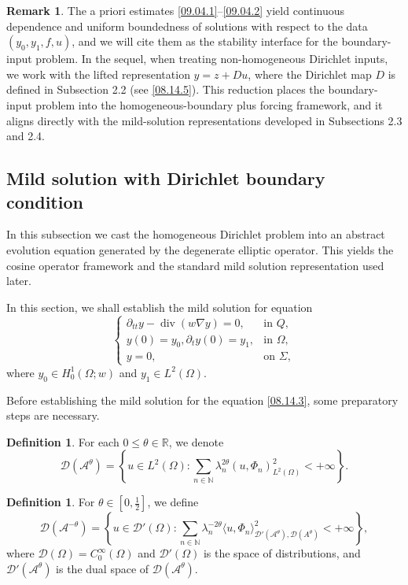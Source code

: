 \documentclass[preprint,12pt]{elsarticle}
\theoremstyle{definition}   %
\newtheorem{definition}[theorem]{Definition}
\newtheorem{remark}[theorem]{Remark}
\numberwithin{equation}{section}
\def\pt{\partial}
\def\ms{\mathscr}
\def\lg{\langle}
\def\rg{\rangle}
\def\pt{\partial}
\def\Om{\Omega}
\def\la{\lambda}
\def\iy{\infty}
\def\f{\frac}
\def\mcA{\mathcal{A}}
\def\mcD{\mathcal{D}}
\DeclareMathOperator{\Div}{div}
\newcommand{\R}{\mathbb R}
\newcommand{\N}{\mathbb N}
\begin{document}
\begin{remark}\label{rem:lifted-setting}
The a priori estimates \eqref{09.04.1}--\eqref{09.04.2} yield continuous dependence and uniform boundedness of solutions with respect to the data $(y_0,y_1,f,u)$, and we will cite them as the stability interface for the boundary-input problem. In the sequel, when treating non-homogeneous Dirichlet inputs, we work with the lifted representation $y=z+Du$, where the Dirichlet map $D$ is defined in Subsection 2.2 (see \eqref{08.14.5}). This reduction places the boundary-input problem into the homogeneous-boundary plus forcing framework, and it aligns directly with the mild-solution representations developed in Subsections 2.3 and 2.4.
\end{remark}

\subsection{Mild solution with Dirichlet boundary condition}

In this subsection we cast the homogeneous Dirichlet problem into an abstract evolution equation generated by the degenerate elliptic operator. This yields the cosine operator framework and the standard mild solution representation used later.


In this section, we shall establish the mild solution for equation
\begin{equation}\label{08.14.3}
	\begin{cases} 
		\pt_{tt}y-\Div(w\nabla y)=0, &\mbox{in }Q,\\
		y(0)=y_0, \pt_t y(0)=y_1, &\mbox{in }\Om,\\
		y=0, &\mbox{on }\Sigma, 
	\end{cases}
\end{equation}
where $y_0\in H_0^1(\Om;w)$ and $y_1\in L^2(\Om)$. 

Before establishing the mild solution for the equation \eqref{08.14.3}, some preparatory steps are necessary.

\begin{definition}\label{08.13.D1}
	For each $0\leq \theta \in\R$, we denote 
	\begin{equation*}
		\mcD(\mcA^\theta)=\left\{u\in L^2(\Om)\colon \sum_{n\in\N}\la_n^{2 \theta}(u,\Phi_n)_{L^2(\Om)}^2<+\iy \right\}.
	\end{equation*}  
\end{definition}

\begin{definition}\label{08.13.D2}
	For $\theta\in [0,\f{1}{2}]$, we define 
	\begin{equation*}
		\mcD(\mcA^{-\theta})=\left\{u\in\ms{D}'(\Om)\colon \sum_{n\in\N}\la_n^{-2\theta}\lg u,\Phi_n\rg_{\mcD'(\mcA^\theta), \mcD(A^\theta)}^2<+\iy\right\}, 
	\end{equation*}
	where  $\ms{D}(\Om)=C_0^\iy(\Om)$ and $\ms{D}'(\Om)$ is the space of distributions, and $\mcD'(\mcA^\theta)$ is the dual space of $\mcD(\mcA^\theta)$. 
\end{definition}
\end{document}
